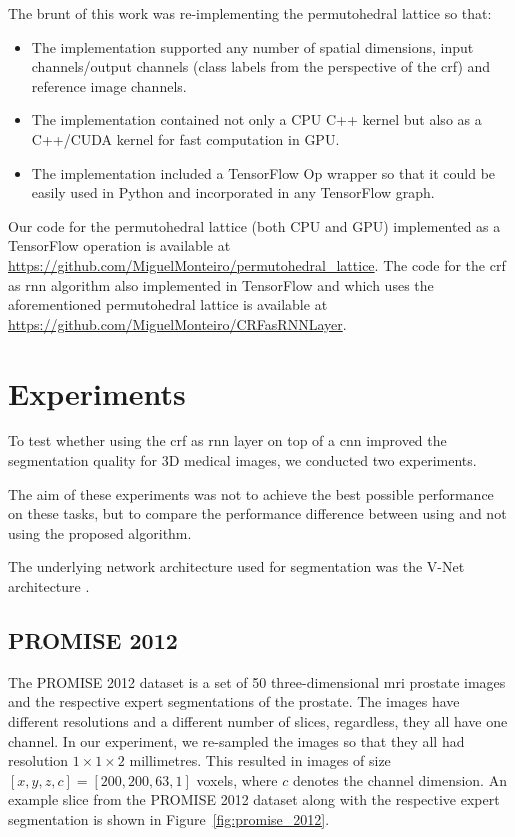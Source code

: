 \documentclass{article}
\begin{document}
The brunt of this work was re-implementing the permutohedral lattice so that:
\begin{itemize}
    \item The implementation supported any number of spatial dimensions, input channels/output channels (class labels from the perspective of the \gls{crf}) and reference image channels. 
    \item The implementation contained not only a CPU C++ kernel but also as a C++/CUDA kernel for fast computation in GPU.
    \item The implementation included a TensorFlow Op wrapper so that it could be easily used in Python and incorporated in any TensorFlow graph.
\end{itemize}

Our code for the permutohedral lattice (both CPU and GPU) implemented as a TensorFlow operation is available at \url{https://github.com/MiguelMonteiro/permutohedral_lattice}.
The code for the \gls{crf} as \gls{rnn} algorithm also implemented in TensorFlow and which uses the aforementioned permutohedral lattice is available at \url{https://github.com/MiguelMonteiro/CRFasRNNLayer}.

\section{Experiments}

To test whether using the \gls{crf} as \gls{rnn} layer on top of a \gls{cnn} improved the segmentation quality for 3D medical images, we conducted two experiments.

The aim of these experiments was not to achieve the best possible performance on these tasks, but to compare the performance difference between using and not using the proposed algorithm.

The underlying network architecture used for segmentation was the V-Net architecture \cite{VNet}.

\subsection{PROMISE 2012}

The PROMISE 2012 dataset \cite{PROMISE_2012} is a set of 50 three-dimensional \gls{mri} prostate images and the respective expert segmentations of the prostate. 
The images have different resolutions and a different number of slices, regardless, they all have one channel.
In our experiment, we re-sampled the images so that they all had resolution $1\times1\times2$ millimetres.
This resulted in images of size $[x, y, z, c] = [200, 200, 63, 1]$ voxels, where $c$ denotes the channel dimension.
An example slice from the PROMISE 2012 dataset along with the respective expert segmentation is shown in Figure~\ref{fig:promise_2012}.
\end{document}

